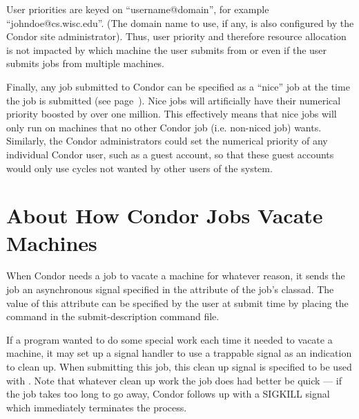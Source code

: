 User priorities are keyed on ``username@domain'', for example
``johndoe@cs.wisc.edu''. (The domain name to use, if any, is also configured by
the Condor site administrator).  Thus, user priority and therefore resource
allocation is not impacted by which machine the user submits from or
even if the user submits jobs from multiple machines.

Finally, any job submitted to Condor can be specified as a ``nice'' job at 
the time the job is submitted (see page~\pageref{man-condor-submit-nice}).
Nice jobs will artificially have their numerical priority boosted by
over one million. This effectively means that nice jobs will only run on
machines that no other Condor job (i.e. non-niced job) wants. Similarly,
the Condor administrators could set the numerical priority of any
individual Condor user, such as a guest account, so that these guest
accounts would only use cycles not wanted by other users of the system.





\section{\label{sec:Vacate-Explained}
About How Condor Jobs Vacate Machines}

When Condor needs a job to vacate a machine for whatever reason, it
sends the job an asynchronous signal specified in the 
attribute of the job's classad.
The value of this attribute can be specified by
the user at submit time by placing the  command in the
 submit-description command file.  

If a program wanted to do some special work each time
it needed to vacate a machine, it may set up a
signal handler to use a trappable signal as an indication
to clean up.
When submitting this job, this clean up signal is specified to be used with
.
Note that whatever clean up work the job does had better be quick
--- if the job takes too long to go away, Condor
follows up with a SIGKILL signal which immediately terminates the
process.

